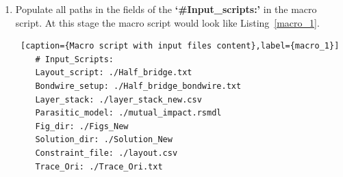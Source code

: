 \documentclass[11pt]{article}
\begin{document}
\begin{enumerate}
    \item Populate all paths in the fields of the \textbf{`\#Input\_scripts:'} in the macro script. At this stage the macro script would look like Listing~\ref{macro_1}.
    \pagebreak

    
    \begin{lstlisting} [caption={Macro script with input files content},label={macro_1}]
    # Input_Scripts:
    Layout_script: ./Half_bridge.txt
    Bondwire_setup: ./Half_bridge_bondwire.txt
    Layer_stack: ./layer_stack_new.csv
    Parasitic_model: ./mutual_impact.rsmdl
    Fig_dir: ./Figs_New
    Solution_dir: ./Solution_New
    Constraint_file: ./layout.csv
    Trace_Ori: ./Trace_Ori.txt

    \end{lstlisting}
    

\end{enumerate}
\end{document}
